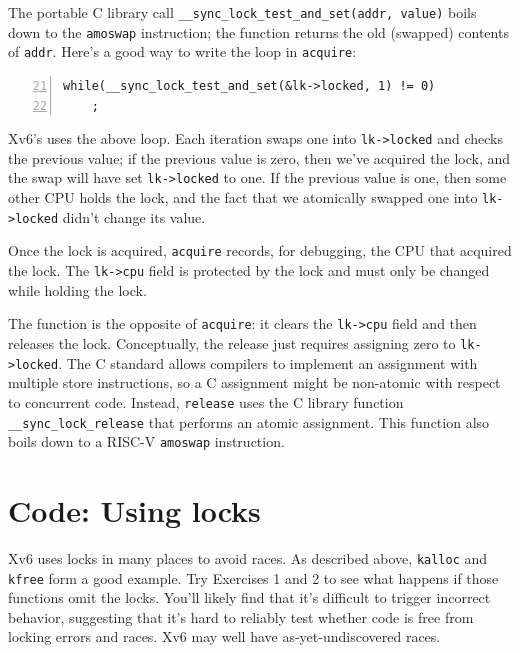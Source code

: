 The portable C library call 
\lstinline{__sync_lock_test_and_set(addr, value)}
boils down to the
\lstinline{amoswap}
instruction;
the function returns the old (swapped) contents of {\tt *addr}.
Here's a good way to write the loop in {\tt acquire}:

\begin{lstlisting}[numbers=left,firstnumber=21]
  while(__sync_lock_test_and_set(&lk->locked, 1) != 0)
    ;
\end{lstlisting}

Xv6's 
uses the above loop.
Each iteration swaps one into
\lstinline{lk->locked} 
and checks the previous value;
if the previous value is zero, then we've acquired the
lock, and the swap will have set 
\lstinline{lk->locked}
to one.
If the previous value is one, then some other CPU
holds the lock, and the fact that we atomically swapped one into
\lstinline{lk->locked}
didn't change its value.

Once the lock is acquired,
\lstinline{acquire}
records, for debugging, the CPU 
that acquired the lock.
The
\lstinline{lk->cpu}
field is protected by the lock
and must only be changed while holding the lock.

The function
is the opposite of 
\lstinline{acquire}:
it clears the 
\lstinline{lk->cpu}
field
and then releases the lock.
Conceptually, the release just requires assigning zero to
\lstinline{lk->locked}.
The C standard allows compilers to implement an assignment
with multiple store instructions,
so a C assignment might be non-atomic with respect
to concurrent code.
Instead,
\lstinline{release}
uses the C library function
\lstinline{__sync_lock_release}
that performs an atomic assignment.
This function also boils down to a RISC-V
\lstinline{amoswap}
instruction.
\section{Code: Using locks}
Xv6 uses locks in many places to avoid races.
As described above,
\lstinline{kalloc}
and
\lstinline{kfree}
form a good example.
Try Exercises 1 and 2 to see what happens if those
functions omit the locks.
You'll likely find that it's difficult to trigger incorrect
behavior, suggesting that it's hard to reliably test whether code
is free from locking errors and races.
Xv6 may well have as-yet-undiscovered races.


